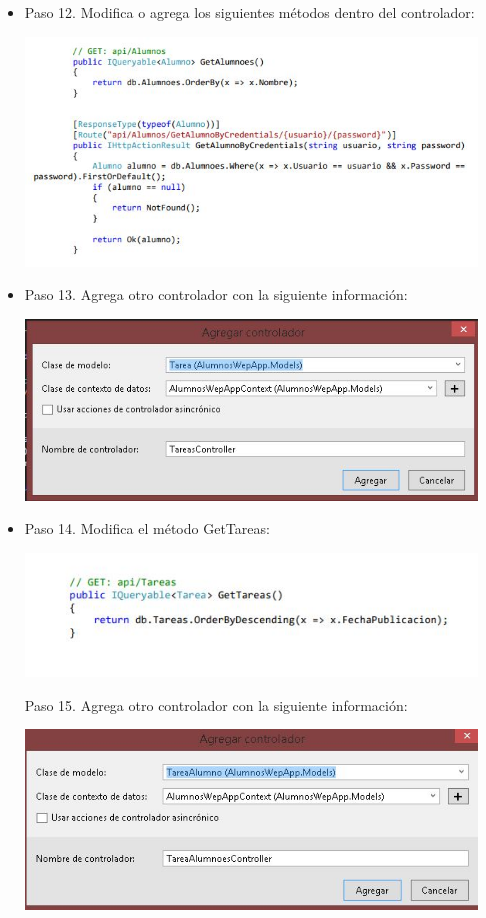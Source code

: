 \begin{flushleft}
\begin{itemize}
\item Paso 12. Modifica o agrega los siguientes métodos dentro del controlador:
\begin{center}
	\includegraphics[width=12cm]{./Imagenes/paso12} 
	\end{center}

\item Paso 13. Agrega otro controlador con la siguiente información: 
\begin{center}
	\includegraphics[width=12cm]{./Imagenes/paso13} 
	\end{center}

\item Paso 14. Modifica el método GetTareas: 

\begin{center}
	\includegraphics[width=12cm]{./Imagenes/paso14} 
	\end{center}

Paso 15. Agrega otro controlador con la siguiente información: 
\begin{center}
	\includegraphics[width=12cm]{./Imagenes/paso15} 
	\end{center}


\end{itemize}
\end{flushleft}

